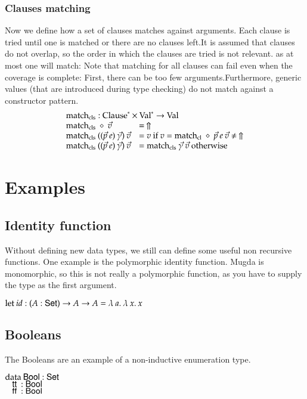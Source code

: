 \subsubsection{Clauses matching} 
Now we define how a set of clauses matches against arguments. 
Each clause is tried until one is matched or there are no clauses left.It is assumed that clauses do not overlap, so the order in which the clauses are tried is not relevant. as at most one will match:
Note that matching for all clauses can fail even when the coverage is complete: First, there can be too few arguments.Furthermore, generic values (that are introduced during type checking) do not match against a constructor pattern. 
\[
\begin{array}{ll}
\multicolumn{2}{l}{\matchcls : \ves{\Clause} \times \ves{\Val} \ra \Val}\\
\matchcls \: \diamond \: \vec{v} & = \stuck \\
\matchcls \:  ((\vec{p} \: e)\:\vec{\gamma}) \: \vec{v} & = v \mbox{ if } v = \matchcl \: \diamond \: \vec{p} \: e \:  \vec{v} \neq \stuck \\
\matchcls \: ((\vec{p} \: e)\:\vec{\gamma}) \: \vec{v} & = \matchcls \: \vec{\gamma} \: \vec{v} \mbox{ otherwise}  
\end{array}
\]


\section{Examples}
\subsection{Identity function}
Without defining new data types, we still can define some useful non recursive functions.
One example is the polymorphic identity function. 
Mugda is monomorphic, so this is not really a polymorphic function, as you have to supply the
type as the first argument.
\begin{bsp}
$\mathrm{let}\: id : ( A : \mathsf{Set} ) \rightarrow{A \rightarrow A} = \lambda\: a .\:\lambda\: x .\:x$   
\end{bsp}

\subsection{Booleans}
The Booleans are an example of a non-inductive enumeration type.
\begin{bsp}
$\mathrm{data}\: \mathsf{Bool} : \mathsf{Set}$  \\
$\hspace*{3mm} \mathsf{tt}\: : \mathsf{Bool} $\\
$\hspace*{3mm} \mathsf{ff}\: : \mathsf{Bool} $
\end{bsp}

